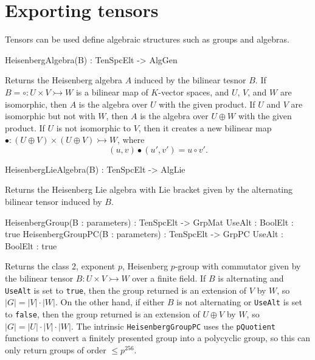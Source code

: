 \section{Exporting tensors}
Tensors can be used define algebraic structures such as groups and algebras.

\begin{intrinsics}
HeisenbergAlgebra(B) : TenSpcElt -> AlgGen
\end{intrinsics}

Returns the Heisenberg algebra $A$ induced by the bilinear tesnor $B$. If $B=\circ : 
U\times V\rightarrowtail W$ is a bilinear map of $K$-vector spaces, and $U$, $V$, and 
$W$ are isomorphic, then $A$ is the algebra over $U$ with the given product. 
If 
$U$ and $V$ are isomorphic but not with $W$, then $A$ is the algebra over 
$U\oplus W$ with the given product. If $U$ is not isomorphic to $V$, then it 
creates a new bilinear map $\bullet:(U\oplus V) \times (U\oplus V)\rightarrowtail W$, 
where 
\[ (u,v)\bullet (u',v') = u\circ v'. \]

\begin{intrinsics}
HeisenbergLieAlgebra(B) : TenSpcElt -> AlgLie
\end{intrinsics}

Returns the Heisenberg Lie algebra with Lie bracket given by the alternating 
bilinear tensor induced by $B$.

\begin{intrinsics}
HeisenbergGroup(B : parameters) : TenSpcElt -> GrpMat
    UseAlt : BoolElt : true
HeisenbergGroupPC(B : parameters) : TenSpcElt -> GrpPC
    UseAlt : BoolElt : true
\end{intrinsics}

Returns the class 2, exponent $p$, Heisenberg $p$-group with commutator given by the bilinear tensor $B: U \times V \rightarrowtail W$ over a finite field. 
If $B$ is alternating and {\tt UseAlt} is set to {\tt true}, then the group returned is an extension of $V$ by $W$, so $|G| = |V|\cdot |W|$. 
On the other hand, if either $B$ is not alternating or {\tt UseAlt} is set to {\tt false}, then the group returned is an extension of $U\oplus V$ by $W$, so $|G| = |U|\cdot |V| \cdot |W|$.  
The intrinsic {\tt HeisenbergGroupPC} uses the {\tt pQuotient} functions to convert a finitely presented group into a polycyclic group, so this can only return groups of order $\leq p^{256}$. 


